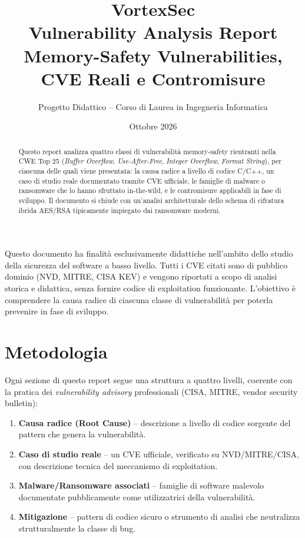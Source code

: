 \documentclass[11pt,a4paper]{article}
\title{\textbf{VortexSec}\\[0.3cm]
\large Vulnerability Analysis Report \\
\large Memory-Safety Vulnerabilities, CVE Reali e Contromisure}
\author{Progetto Didattico -- Corso di Laurea in Ingegneria Informatica}
\date{Ottobre 2026}
\begin{document}
\maketitle

\begin{disclaimerbox}
Questo documento ha finalità esclusivamente didattiche nell'ambito dello studio della sicurezza del software a basso livello. Tutti i CVE citati sono di pubblico dominio (NVD, MITRE, CISA KEV) e vengono riportati a scopo di analisi storica e didattica, senza fornire codice di exploitation funzionante. L'obiettivo è comprendere la causa radice di ciascuna classe di vulnerabilità per poterla prevenire in fase di sviluppo.
\end{disclaimerbox}

\begin{abstract}
Questo report analizza quattro classi di vulnerabilità memory-safety rientranti nella CWE Top 25 (\textit{Buffer Overflow}, \textit{Use-After-Free}, \textit{Integer Overflow}, \textit{Format String}), per ciascuna delle quali viene presentata: la causa radice a livello di codice C/C++, un caso di studio reale documentato tramite CVE ufficiale, le famiglie di malware o ransomware che lo hanno sfruttato in-the-wild, e le contromisure applicabili in fase di sviluppo. Il documento si chiude con un'analisi architetturale dello schema di cifratura ibrida AES/RSA tipicamente impiegato dai ransomware moderni.
\end{abstract}

\tableofcontents
\newpage

\section{Metodologia}

Ogni sezione di questo report segue una struttura a quattro livelli, coerente con la pratica dei \textit{vulnerability advisory} professionali (CISA, MITRE, vendor security bulletin):

\begin{enumerate}
    \item \textbf{Causa radice (Root Cause)} -- descrizione a livello di codice sorgente del pattern che genera la vulnerabilità.
    \item \textbf{Caso di studio reale} -- un CVE ufficiale, verificato su NVD/MITRE/CISA, con descrizione tecnica del meccanismo di exploitation.
    \item \textbf{Malware/Ransomware associati} -- famiglie di software malevolo documentate pubblicamente come utilizzatrici della vulnerabilità.
    \item \textbf{Mitigazione} -- pattern di codice sicuro o strumento di analisi che neutralizza strutturalmente la classe di bug.
\end{enumerate}
\end{document}
